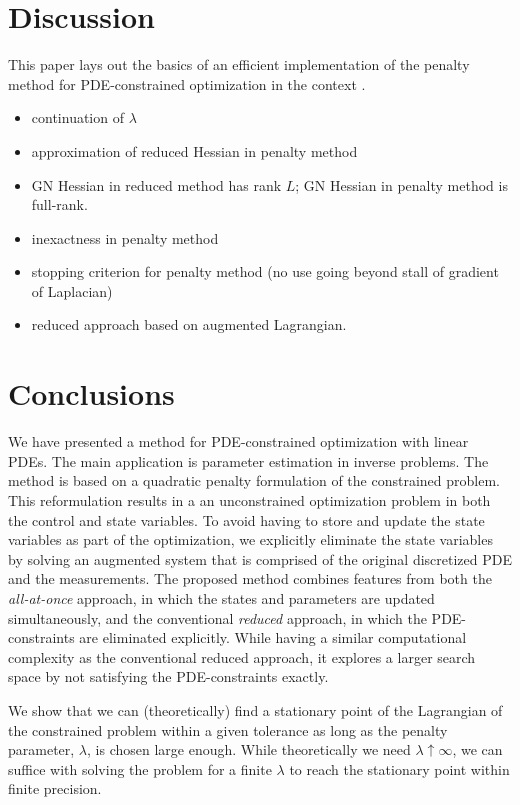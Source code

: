 \documentclass{iopart}
\begin{document}
{\section{Discussion}
\label{discussion}
This paper lays out the basics of an efficient implementation of the
penalty method for PDE-constrained optimization in the context . 
\begin{itemize}
\item continuation of $\lambda$
\item approximation of reduced Hessian in penalty method
\item GN Hessian in reduced method has rank $L$; GN Hessian in penalty method is full-rank.
\item inexactness in penalty method
\item stopping criterion for penalty method (no use going beyond stall of gradient of Laplacian)
\item reduced approach based on augmented Lagrangian.
\end{itemize}
\section{Conclusions}
\label{conclusion}
We have presented a method for PDE-constrained optimization with linear PDEs. The main application
is parameter estimation in inverse problems.
The method is based on a quadratic penalty formulation of the constrained problem. This reformulation
results in a an unconstrained optimization problem in both the control and state variables.
To avoid having to store and update the state variables as part of the optimization, we explicitly eliminate
the state variables by solving an augmented system that is comprised of the original discretized PDE and the measurements. 
The proposed method combines features from both the \emph{all-at-once}
approach, in which the states and parameters are updated simultaneously, and
the conventional \emph{reduced} approach, in which the PDE-constraints are eliminated explicitly.
While having a similar computational complexity as the conventional reduced approach, it explores
a larger search space by not satisfying the PDE-constraints exactly. 

We show that we can (theoretically)
find a stationary point of the Lagrangian of the constrained problem within a given tolerance as long as the penalty parameter, $\lambda$,
is chosen large enough. While theoretically we need $\lambda \uparrow \infty$, we can suffice with solving the problem
for a finite $\lambda$ to reach the stationary point within finite precision. 

}
\end{document}

